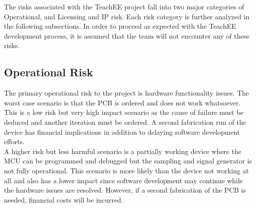 \documentclass[letterpaper,12pt]{article}
\begin{document}









The risks associated with the TeachEE project fall into two major categories of
Operational, and Licensing and IP risk. Each risk category is further analyzed in
the following subsections. In order to proceed as expected with the TeachEE
development process, it is assumed that the team will not encounter any of these
risks.

\subsection{Operational Risk}
The primary operational risk to the project is hardware functionality issues.
The worst case scenario is that the PCB is ordered and does not work whatsoever.
This is a low risk but very high impact scenario as the cause of failure must be
deduced and another iteration must be ordered. A second fabrication run of the
device has financial implications in addition to delaying software
development efforts. \\

\noindent
A higher risk but less harmful scenario is a partially working device where the
MCU can be programmed and debugged but the sampling and signal generator is not
fully operational. This scenario is more likely than the device not working at
all and also has a lower impact since software development may continue while
the hardware issues are resolved. However, if a second fabrication of the PCB is
needed, financial costs will be incurred. \\
\end{document}
